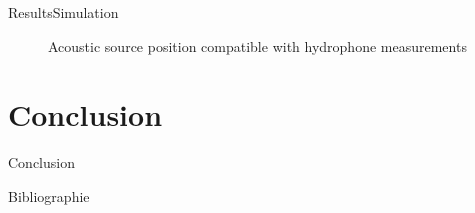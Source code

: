 \documentclass[9pt, xcolor={usenames, dvipsnames}]{beamer}
\begin{document}
\begin{frame}{Results}{Simulation}
\begin{minipage}[c]{0.48\textwidth}
\begin{figure}
						\caption{Acoustic source position compatible with hydrophone measurements}
					\end{figure}
				\end{minipage}
			\end{frame}

		\section{Conclusion}
		
			\begin{frame}{Conclusion}
				\centering
				\begin{minipage}{0.55\textwidth}
					
				\end{minipage}
				\hfill
				\begin{minipage}{0.4\textwidth}
					
				\end{minipage}
			\end{frame}
	
		\begin{frame}{Bibliographie}
			\printbibliography
		\end{frame}
\end{document}
